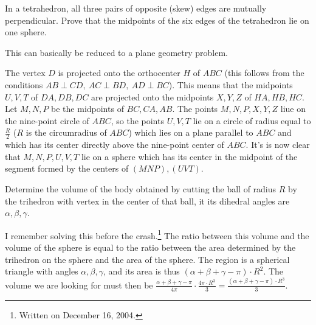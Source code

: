 \begin{question}[name={1959--1966 IMO Longlist}]
	In a tetrahedron, all three pairs of opposite (skew) edges are mutually perpendicular. Prove that the midpoints of the six edges of the tetrahedron lie on one sphere.
\end{question}

\begin{solution}[name={Solution by Grobber}]
	This can basically be reduced to a plane geometry problem.
	
	The vertex $D$ is projected onto the orthocenter $H$ of $ABC$ (this follows from the conditions $AB\perp CD,\ AC\perp BD,\ AD\perp BC$). This means that the midpoints $U,V,T$ of $DA,DB,DC$ are projected onto the midpoints $X,Y,Z$ of $HA,HB,HC$. Let $M,N,P$ be the midpoints of $BC,CA,AB$. The points $M,N,P,X,Y,Z$ liue on the nine-point circle of $ABC$, so the points $U,V,T$ lie on a circle of radius equal to $\frac R2$ ($R$ is the circumradius of $ABC$) which lies on a plane parallel to $ABC$ and which has its center directly above the nine-point center of $ABC$. It's is now clear that $M,N,P,U,V,T$ lie on a sphere which has its center in the midpoint of the segment formed by the centers of $(MNP),(UVT)$.
\end{solution}




\begin{question}[name={1967 IMO Longlist}]
	Determine the volume of the body obtained by cutting the ball of radius $R$ by the trihedron with vertex in the center of that ball, it its dihedral angles are $\alpha, \beta, \gamma.$
\end{question}

\begin{solution}[name={Solution by Grobber}] 
	I remember solving this before the crash.\footnote{Written on December 16, 2004.}
	The ratio between this volume and the volume of the sphere is equal to the ratio between the area determined by the trihedron on the sphere and the area of the sphere. The region is a spherical triangle with angles $\alpha,\beta,\gamma$, and its area is thus $(\alpha+\beta+\gamma-\pi)\cdot R^2$. The volume we are looking for must then be $\frac{\alpha+\beta+\gamma-\pi}{4\pi}\cdot \frac{4\pi\cdot R^3}3=\frac{(\alpha+\beta+\gamma-\pi)\cdot R^3}3$.	
\end{solution}
	
	


